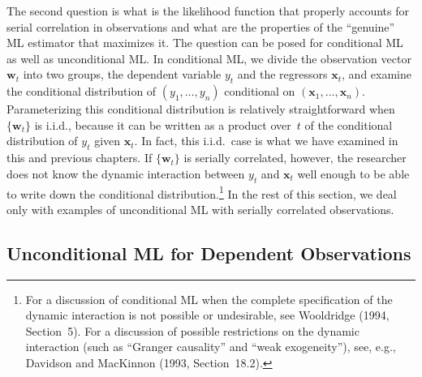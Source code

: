 The second question is what is the likelihood function that properly accounts
for serial correlation in observations and what are the properties of the ``genuine''
ML estimator that maximizes it. The question can be posed for conditional ML
as well as unconditional ML. In conditional ML, we divide the observation vector
$\mathbf{w}_t$ into two groups, the dependent variable $y_t$ and the regressors $\mathbf{x}_t$, and examine
the conditional distribution of $(y_1, \ldots, y_n)$ conditional on $(\mathbf{x}_1, \ldots, \mathbf{x}_n)$. Parameterizing this conditional distribution is relatively straightforward when $\{\mathbf{w}_t\}$ is i.i.d.,
because it can be written as a product over~$t$ of the conditional distribution of $y_t$
given $\mathbf{x}_t$. In fact, this i.i.d.\ case is what we have examined in this and previous
chapters. If $\{\mathbf{w}_t\}$ is serially correlated, however, the researcher does not know the
dynamic interaction between $y_t$ and $\mathbf{x}_t$ well enough to be able to write down the
conditional distribution.\footnote{For a discussion of conditional ML when the complete specification of the dynamic interaction is not possible or undesirable, see Wooldridge (1994, Section~5). For a discussion of possible restrictions on the dynamic
interaction (such as ``Granger causality'' and ``weak exogeneity''), see, e.g., Davidson and MacKinnon (1993,
Section~18.2).}
In the rest of this section, we deal only with examples
of unconditional ML with serially correlated observations.

\subsection*{Unconditional ML for Dependent Observations}

